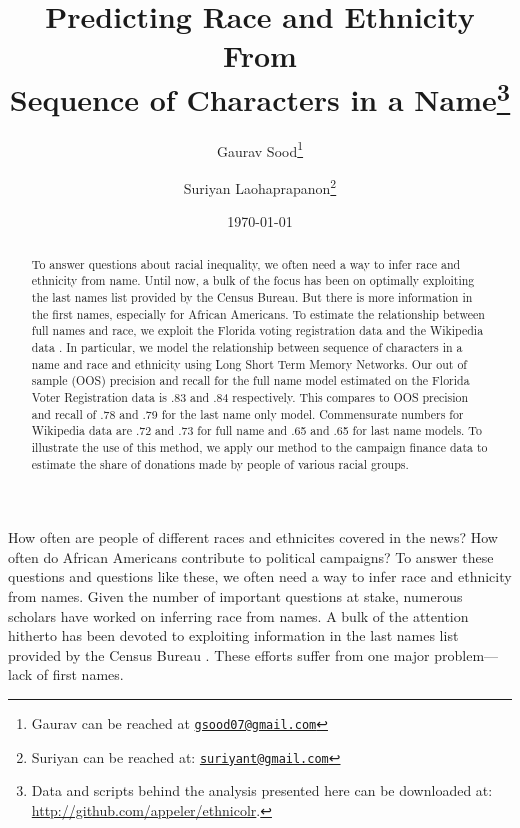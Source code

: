 \documentclass[12pt, letterpaper]{article}
\title{\Large{Predicting Race and Ethnicity From\\Sequence of Characters in a Name}\footnote{Data and scripts behind the analysis presented here can be downloaded at: \url{http://github.com/appeler/ethnicolr}.
}}
\author{Gaurav Sood\thanks{Gaurav can be reached at \href{mailto:gsood07@gmail.com}{\footnotesize{\texttt{gsood07@gmail.com}}}} \and Suriyan Laohaprapanon\thanks{Suriyan can be reached at: \href{mailto:suriyant@gmail.com}{\footnotesize{\texttt{suriyant@gmail.com}}}}\vspace{.5cm}}
\date{\vspace{.5cm}\normalsize{\today}}
\begin{document}
\maketitle

\begin{center}
\end{center}

\begin{comment}

setwd(paste0(githubdir, "ethnicolr_paper/"))
tools::texi2dvi("name_race.tex", pdf = TRUE, clean = TRUE) 
setwd(basedir)

\end{comment}


\begin{abstract}
To answer questions about racial inequality, we often need a way to infer race and ethnicity from name. Until now, a bulk of the focus has been on optimally exploiting the last names list provided by the Census Bureau. But there is more information in the first names, especially for African Americans. To estimate the relationship between full names and race, we exploit the Florida voting registration data and the Wikipedia data \citep{ambekar2009name}. In particular, we model the relationship between sequence of characters in a name and race and ethnicity using Long Short Term Memory Networks. Our out of sample (OOS) precision and recall for the full name model estimated on the Florida Voter Registration data is .83 and .84 respectively. This compares to OOS precision and recall of .78 and .79 for the last name only model. Commensurate numbers for Wikipedia data are .72 and .73 for full name and .65 and .65 for last name models. To illustrate the use of this method, we apply our method to the campaign finance data to estimate the share of donations made by people of various racial groups.
\end{abstract}
\clearpage
\doublespace

How often are people of different races and ethnicites covered in the news? How often do African Americans contribute to political campaigns? To answer these questions and questions like these, we often need a way to infer race and ethnicity from names. Given the number of important questions at stake, numerous scholars have worked on inferring race from names. A bulk of the attention hitherto has been devoted to  exploiting information in the last names list provided by the Census Bureau \citep[see, for e.g.,][]{fiscella2006use, imai2016improving}. These efforts suffer from one major problem---lack of first names. 
\end{document}
